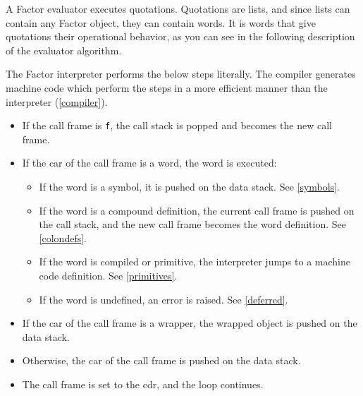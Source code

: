 \documentclass{book}
\begin{document}
\newcommand{\csglos}{\glossary{
name=return stack,
description=see call stack}
}
\csglos
\newcommand{\cfglos}{}
\cfglos
{}

A Factor evaluator executes quotations. Quotations are lists, and since lists can contain any Factor object, they can contain words. It is words that give quotations their operational behavior, as you can see in the following description of the evaluator algorithm.

The Factor interpreter performs the below steps literally. The compiler generates machine code which perform the steps in a more efficient manner than the interpreter (\ref{compiler}).

\begin{itemize}
\item If the call frame is \texttt{f}, the call stack is popped and becomes the new call frame.
\item If the car of the call frame is a word, the word is executed:
\begin{itemize}
\item If the word is a symbol, it is pushed on the data stack. See \ref{symbols}.
\item If the word is a compound definition, the current call frame is pushed on the call stack, and the new call frame becomes the word definition. See \ref{colondefs}.
\item If the word is compiled or primitive, the interpreter jumps to a machine code definition. See \ref{primitives}.
\item If the word is undefined, an error is raised. See \ref{deferred}.
\end{itemize}
\item If the car of the call frame is a wrapper, the wrapped object is pushed on the data stack.
\item Otherwise, the car of the call frame is pushed on the data stack.
\item The call frame is set to the cdr, and the loop continues.
\end{itemize}
\end{document}
